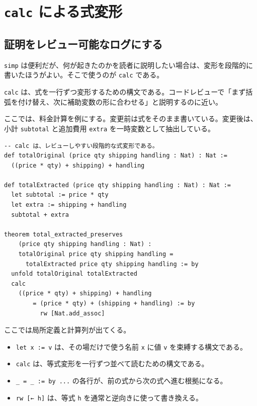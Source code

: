 \section{\texttt{calc} による式変形}

\subsection{証明をレビュー可能なログにする}

\texttt{simp} は便利だが、何が起きたのかを読者に説明したい場合は、変形を段階的に書いたほうがよい。そこで使うのが \texttt{calc} である。

\texttt{calc} は、式を一行ずつ変形するための構文である。コードレビューで「まず括弧を付け替え、次に補助変数の形に合わせる」と説明するのに近い。

ここでは、料金計算を例にする。変更前は式をそのまま書いている。変更後は、小計 \texttt{subtotal} と追加費用 \texttt{extra} を一時変数として抽出している。

\begin{listing}[htbp]
\begin{verbatim}
-- calc は、レビューしやすい段階的な式変形である。
def totalOriginal (price qty shipping handling : Nat) : Nat :=
  ((price * qty) + shipping) + handling

def totalExtracted (price qty shipping handling : Nat) : Nat :=
  let subtotal := price * qty
  let extra := shipping + handling
  subtotal + extra

theorem total_extracted_preserves
    (price qty shipping handling : Nat) :
    totalOriginal price qty shipping handling =
      totalExtracted price qty shipping handling := by
  unfold totalOriginal totalExtracted
  calc
    ((price * qty) + shipping) + handling
        = (price * qty) + (shipping + handling) := by
          rw [Nat.add_assoc]
\end{verbatim}
\caption{一時変数の抽出を等式で確認する}
\label{lst:ch03_calc_extract}
\end{listing}

\begin{syntaxbox}
ここでは局所定義と計算列が出てくる。
\begin{itemize}
\item \texttt{let x := v} は、その場だけで使う名前 \texttt{x} に値 \texttt{v} を束縛する構文である。
\item \texttt{calc} は、等式変形を一行ずつ並べて読むための構文である。
\item \texttt{\_ = \_ := by ...} の各行が、前の式から次の式へ進む根拠になる。
\item \texttt{rw [← h]} は、等式 \texttt{h} を通常と逆向きに使って書き換える。
\end{itemize}
\end{syntaxbox}


